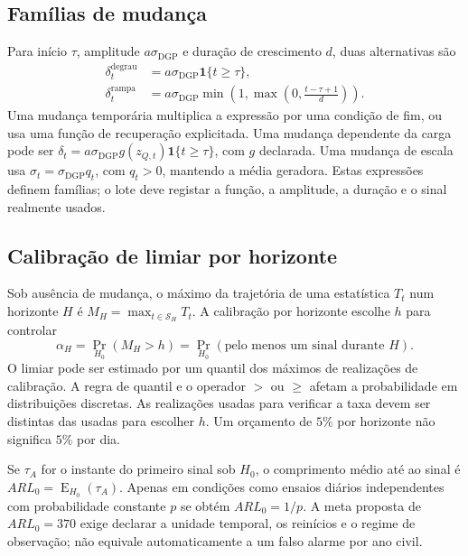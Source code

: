 \subsection{Famílias de mudança}
\label{sec:mat-injecoes}
Para início $\tau$, amplitude $a\sigma_{\mathrm{DGP}}$ e duração de crescimento $d$, duas alternativas são
\begin{align}
\delta_t^{\mathrm{degrau}}&=a\sigma_{\mathrm{DGP}}\mathbf1\{t\geq\tau\},\label{eq:mat-degrau}\\
\delta_t^{\mathrm{rampa}}&=a\sigma_{\mathrm{DGP}}
\min\!\left(1,\max\!\left(0,\frac{t-\tau+1}{d}\right)\right).
\label{eq:mat-rampa}
\end{align}
Uma mudança temporária multiplica a expressão por uma condição de fim, ou usa uma função de recuperação explicitada. Uma mudança dependente da carga pode ser $\delta_t=a\sigma_{\mathrm{DGP}}g(z_{Q,t})\mathbf1\{t\geq\tau\}$, com $g$ declarada. Uma mudança de escala usa $\sigma_t=\sigma_{\mathrm{DGP}}q_t$, com $q_t>0$, mantendo a média geradora. Estas expressões definem famílias; o lote deve registar a função, a amplitude, a duração e o sinal realmente usados.

\subsection{Calibração de limiar por horizonte}
\label{sec:mat-limiares}
Sob ausência de mudança, o máximo da trajetória de uma estatística $T_t$ num horizonte $H$ é $M_H=\max_{t\in\mathcal S_H}T_t$. A calibração por horizonte escolhe $h$ para controlar
\begin{equation}
\alpha_H=\Pr_{H_0}(M_H>h)
=\Pr_{H_0}(\text{pelo menos um sinal durante }H).
\label{eq:mat-fap-horizonte}
\end{equation}
O limiar pode ser estimado por um quantil dos máximos de realizações de calibração. A regra de quantil e o operador $>$ ou $\geq$ afetam a probabilidade em distribuições discretas. As realizações usadas para verificar a taxa devem ser distintas das usadas para escolher $h$. Um orçamento de $5\%$ por horizonte não significa $5\%$ por dia.

Se $\tau_A$ for o instante do primeiro sinal sob $H_0$, o comprimento médio até ao sinal é $ARL_0=\operatorname{E}_{H_0}(\tau_A)$. Apenas em condições como ensaios diários independentes com probabilidade constante $p$ se obtém $ARL_0=1/p$. A meta proposta de $ARL_0=370$ exige declarar a unidade temporal, os reinícios e o regime de observação; não equivale automaticamente a um falso alarme por ano civil.

